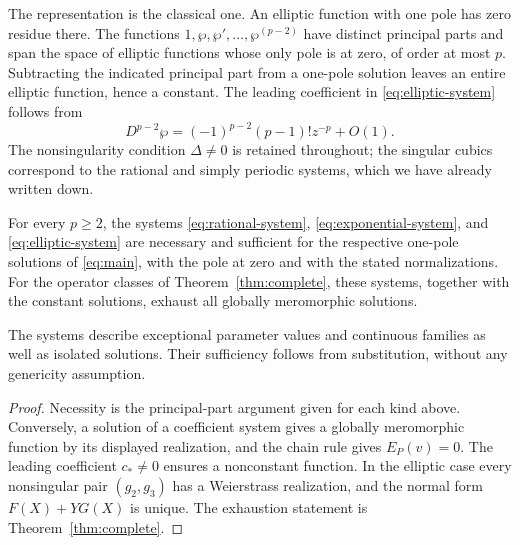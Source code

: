 The representation is the classical one. An elliptic function with
one pole has zero residue there.
The functions \(1,\wp,\wp',\ldots,\wp^{(p-2)}\) have distinct
principal parts and span the space of elliptic functions whose only
pole is at zero, of order at most \(p\).
Subtracting the indicated principal part from a one-pole solution
leaves an entire elliptic function, hence a constant.
The leading coefficient in \eqref{eq:elliptic-system} follows from
\[
 D^{p-2}\wp=(-1)^{p-2}(p-1)!z^{-p}+O(1).
\]
The nonsingularity condition \(\Delta\ne0\) is retained throughout;
the singular cubics correspond to the rational and simply periodic
systems, which we have already written down.

\begin{theorem}\label{thm:systems}
For every \(p\ge2\), the systems
\eqref{eq:rational-system}, \eqref{eq:exponential-system}, and
\eqref{eq:elliptic-system} are necessary and sufficient for the
respective one-pole solutions of \eqref{eq:main}, with the pole at
zero and with the stated normalizations.
For the operator classes of Theorem~\ref{thm:complete}, these systems,
together with the constant solutions, exhaust all globally meromorphic
solutions.

The systems describe exceptional parameter values and continuous
families as well as isolated solutions. Their sufficiency follows
from substitution, without any genericity assumption.
\end{theorem}

\begin{proof}
Necessity is the principal-part argument given for each kind above.
Conversely, a solution of a coefficient system gives a globally
meromorphic function by its displayed realization, and the chain rule
gives \(E_P(v)=0\).
The leading coefficient \(c_\ast\ne0\) ensures a nonconstant function.
In the elliptic case every nonsingular pair \((g_2,g_3)\) has a
Weierstrass realization, and the normal form \(F(X)+YG(X)\) is unique.
The exhaustion statement is Theorem~\ref{thm:complete}.
\end{proof}
